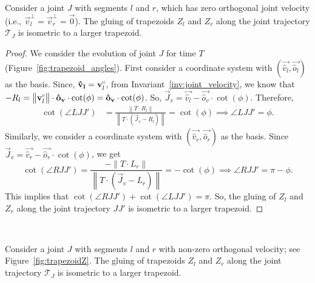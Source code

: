 \begin{lemma}
\label{lem:trapezoid_gluing_parallel}
Consider a joint $J$ with segments $l$ and $r$,
which has zero orthogonal joint velocity (i.e., $\vec v_l^\perp = \vec v_r^\perp = \vec 0$).
The gluing of trapezoids $Z_l$ and $Z_r$ along the joint trajectory $\mathcal T_J$ is isometric to a larger trapezoid.
\end{lemma}
\begin{proof}
We consider the evolution of joint $J$ for time $T$ (Figure~\ref{fig:trapezoid_angles}).
First consider a coordinate system with $(\vec{\hat v_l}, \vec{\hat o_l})$ as the basis.
Since, $\vec{\hat v_l} = \vec v_l^\shortparallel$, from Invariant~\ref{inv:joint_velocity},
we know that $-R_l = \left\| \vec v_l^\shortparallel\right\|\cdot\vec{\hat o_v}\cdot\cot(\phi) = \vec{\hat o_v}\cdot\cot(\phi)$.
So, $\vec J_v = \vec{\hat v_l} - \vec{\hat o_v}\cdot\cot(\phi)$.  Therefore,
\begin{align*}
    \cot(\angle LJJ') &= \frac{\left\| T\cdot R_l\right\|}{ \left\| T\cdot(\vec J_v - R_l)\right\|} = \cot(\phi)
    \implies \angle LJJ' = \phi.
\end{align*}
Similarly, we consider a coordinate system with $(\vec{\hat v_r}, \vec{\hat o_r})$ as the basis.
Since $\vec J_v = \vec{\hat v_r} - \vec{\hat o_r}\cdot \cot(\phi)$, we get
$$
\cot(\angle RJJ') = \frac{-\left\| T\cdot L_r\right\|}{ \left\| T\cdot(\vec J_v - L_r)\right\|} = -\cot(\phi)
\implies \angle RJJ' = \pi - \phi.
$$
This implies that $\cot(\angle RJJ') + \cot(\angle LJJ') = \pi$.
So, the gluing of $Z_l$ and $Z_r$ along the joint trajectory $JJ'$ is isometric to a larger trapezoid.
\end{proof}



~
\vspace*{-4ex}

\begin{lemma}
\label{lem:trapezoid_gluing}
Consider a joint $J$ with segments $l$ and $r$ with non-zero orthogonal velocity; see Figure~\ref{fig:trapezoidZ}.
The gluing of trapezoids $Z_l$ and $Z_r$ along the joint trajectory $\mathcal T_J$ is isometric to a larger trapezoid.
\end{lemma}

